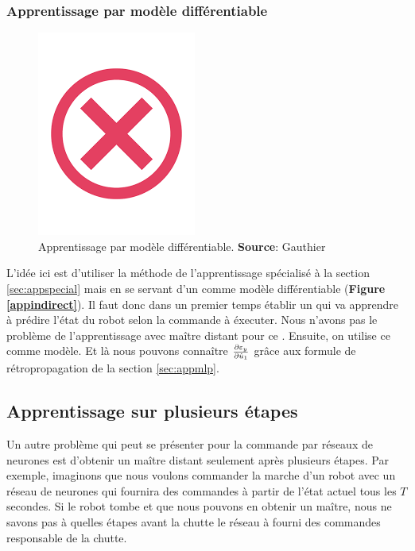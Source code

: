 \subsubsection{Apprentissage par modèle différentiable}\label{sec:appmodele}
\begin{figure}
 \centering
 \includegraphics[scale=0.5]{../figures/invalid.png}
 \caption{Apprentissage par modèle différentiable. \textbf{Source}: Gauthier\cite{Gauthier}}
 \label{appmodele}
\end{figure}

L'idée ici est d'utiliser la méthode de l'apprentissage spécialisé à la section \ref{sec:appspecial} mais en se servant d'un \rna comme modèle différentiable (\textbf{Figure \ref{appindirect}}).
Il faut donc dans un premier temps établir un \rna qui va apprendre à prédire l'état du robot selon la commande à éxecuter.
Nous n'avons pas le problème de l'apprentissage avec maître distant pour ce \rna.
Ensuite, on utilise ce \rna comme modèle. Et là nous pouvons connaître $\frac{\partial \varepsilon_y}{\partial \hat{u}_1}$ grâce aux formule de rétropropagation de la section \ref{sec:appmlp}.

\subsection{Apprentissage sur plusieurs étapes}
Un autre problème qui peut se présenter pour la commande par réseaux de neurones est d'obtenir un maître distant seulement après plusieurs étapes.
Par exemple, imaginons que nous voulons commander la marche d'un robot avec un réseau de neurones qui fournira des commandes à partir de l'état actuel tous les $T$ secondes.
Si le robot tombe et que nous pouvons en obtenir un maître, nous ne savons pas à quelles étapes avant la chutte le réseau à fourni des commandes responsable de la chutte.\\

